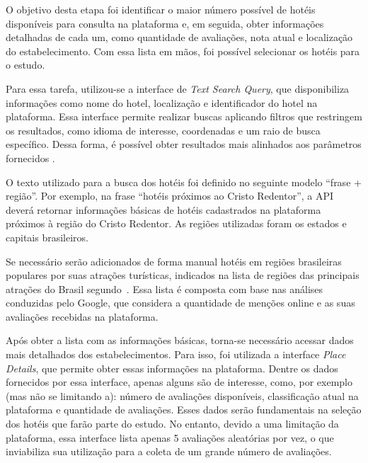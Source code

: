 O objetivo desta etapa foi identificar o maior número possível de hotéis disponíveis para consulta na plataforma e, em seguida, obter informações detalhadas de cada um, como quantidade de avaliações, nota atual e localização do estabelecimento. Com essa lista em mãos, foi possível selecionar os hotéis para o estudo.

Para essa tarefa, utilizou-se a interface de \emph{Text Search Query}, que disponibiliza informações como nome do hotel, localização e identificador do hotel na plataforma. Essa interface permite realizar buscas aplicando filtros que restringem os resultados, como idioma de interesse, coordenadas e um raio de busca específico. Dessa forma, é possível obter resultados mais alinhados aos parâmetros fornecidos \cite{placesSearchText2023}.

% 

O texto utilizado para a busca dos hotéis foi definido no seguinte modelo “frase + região”. Por exemplo, na frase “hotéis próximos ao Cristo Redentor”, a API deverá retornar informações básicas de hotéis cadastrados na plataforma próximos à região do Cristo Redentor. As regiões utilizadas foram os estados e capitais brasileiros.

Se necessário serão adicionados de forma manual hotéis em regiões brasileiras populares por suas atrações turísticas, indicados na lista de regiões das principais atrações do Brasil segundo~. Essa lista é composta com base nas análises conduzidas pelo Google, que considera a quantidade de menções online e as suas avaliações recebidas na plataforma.

Após obter a lista com as informações básicas, torna-se necessário acessar dados mais detalhados dos estabelecimentos. Para isso, foi utilizada a interface \emph{Place Details}, que permite obter essas informações na plataforma. Dentre os dados fornecidos por essa interface, apenas alguns são de interesse, como, por exemplo (mas não se limitando a): número de avaliações disponíveis, classificação atual na plataforma e quantidade de avaliações. Esses dados serão fundamentais na seleção dos hotéis que farão parte do estudo. No entanto, devido a uma limitação da plataforma, essa interface lista apenas 5 avaliações aleatórias por vez, o que inviabiliza sua utilização para a coleta de um grande número de avaliações.


